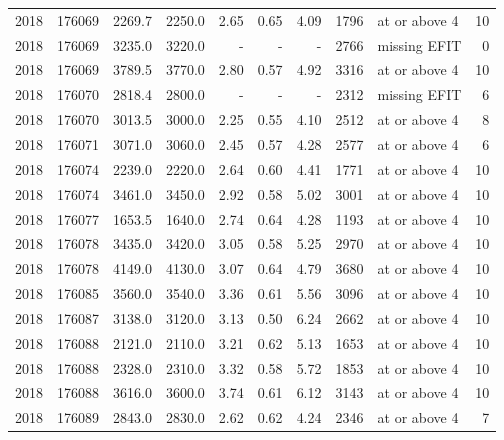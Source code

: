 \begin{longtable}{@{}rrrrrrrrlr@{}}
2018 & 176069 & 2269.7 & 2250.0 & 2.65 & 0.65 & 4.09 & 1796 & at or above 4 & 10 \\
2018 & 176069 & 3235.0 & 3220.0 & - & - & - & 2766 & missing EFIT & 0 \\
2018 & 176069 & 3789.5 & 3770.0 & 2.80 & 0.57 & 4.92 & 3316 & at or above 4 & 10 \\
2018 & 176070 & 2818.4 & 2800.0 & - & - & - & 2312 & missing EFIT & 6 \\
2018 & 176070 & 3013.5 & 3000.0 & 2.25 & 0.55 & 4.10 & 2512 & at or above 4 & 8 \\
2018 & 176071 & 3071.0 & 3060.0 & 2.45 & 0.57 & 4.28 & 2577 & at or above 4 & 6 \\
2018 & 176074 & 2239.0 & 2220.0 & 2.64 & 0.60 & 4.41 & 1771 & at or above 4 & 10 \\
2018 & 176074 & 3461.0 & 3450.0 & 2.92 & 0.58 & 5.02 & 3001 & at or above 4 & 10 \\
2018 & 176077 & 1653.5 & 1640.0 & 2.74 & 0.64 & 4.28 & 1193 & at or above 4 & 10 \\
2018 & 176078 & 3435.0 & 3420.0 & 3.05 & 0.58 & 5.25 & 2970 & at or above 4 & 10 \\
2018 & 176078 & 4149.0 & 4130.0 & 3.07 & 0.64 & 4.79 & 3680 & at or above 4 & 10 \\
2018 & 176085 & 3560.0 & 3540.0 & 3.36 & 0.61 & 5.56 & 3096 & at or above 4 & 10 \\
2018 & 176087 & 3138.0 & 3120.0 & 3.13 & 0.50 & 6.24 & 2662 & at or above 4 & 10 \\
2018 & 176088 & 2121.0 & 2110.0 & 3.21 & 0.62 & 5.13 & 1653 & at or above 4 & 10 \\
2018 & 176088 & 2328.0 & 2310.0 & 3.32 & 0.58 & 5.72 & 1853 & at or above 4 & 10 \\
2018 & 176088 & 3616.0 & 3600.0 & 3.74 & 0.61 & 6.12 & 3143 & at or above 4 & 10 \\
2018 & 176089 & 2843.0 & 2830.0 & 2.62 & 0.62 & 4.24 & 2346 & at or above 4 & 7 \\
\end{longtable}
\endgroup
